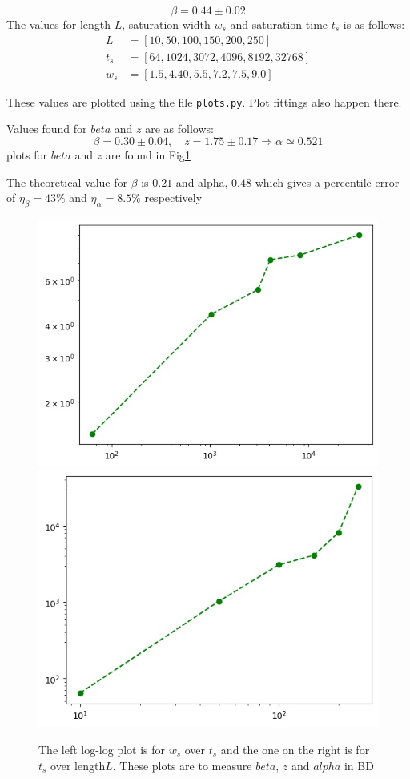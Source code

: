 \documentclass[12pt]{article}
\begin{document}
\begin{equation*}
	\beta = 0.44 \pm 0.02
\end{equation*}
The values for length $L$, saturation width $w_s$ and saturation time $t_s$ is as follows:
\begin{equation*}
	\begin{aligned}
		L		 &= [10, 50, 100, 150, 200, 250]\\
		t_s		&= [64, 1024, 3072, 4096, 8192, 32768]\\
		w_s	  &= [1.5, 4.40, 5.5, 7.2, 7.5, 9.0] 
	\end{aligned}
\end{equation*}

These values are plotted using the file \texttt{plots.py}. Plot fittings also happen there.

Values found for $beta$ and $z$ are as follows:
\begin{equation*}
	\beta = 0.30 \pm 0.04, \quad z = 1.75 \pm 0.17  \Rightarrow \alpha \simeq 0.521
\end{equation*}
plots for $beta$ and $z$ are found in Fig\ref{fig:BDbeta_z}

The theoretical value for $\beta$ is $0.21$ and alpha, $0.48$ which gives a percentile 
error of $\eta_\beta = 43\%$ and $\eta_\alpha = 8.5\%$ respectively
\begin{figure}[h!]
	\centering
	\includegraphics[width=.4\linewidth]{../P6/beta.jpg}
	\includegraphics[width=.4\linewidth]{../P6/z.jpg}
	\label{fig:BDbeta_z}
	\caption{The left log-log plot is for $w_s$ over $t_s$ and the one on the right is for 
		$t_s$ over length$L$. These plots are to measure $beta$, $z$ and $alpha$ in BD}
\end{figure}
	
\end{document}
